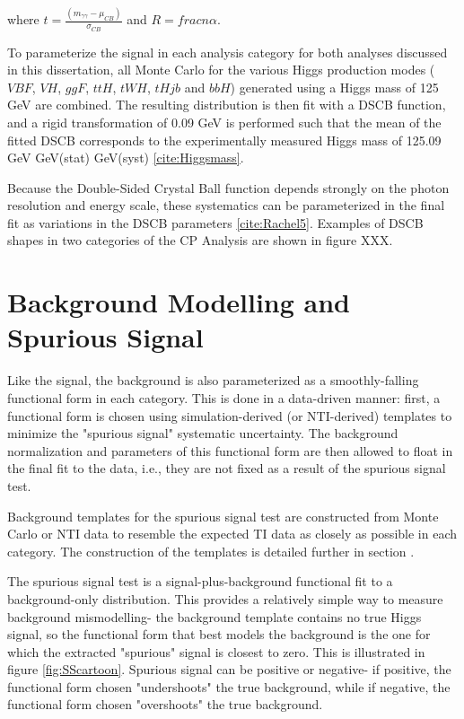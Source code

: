 where $t = \frac{(m_{\gamma \gamma} - \mu_{CB})}{\sigma_{CB}}$ and $R = frac{n}{\alpha}$. 

To parameterize the signal in each analysis category for both analyses discussed in this dissertation, all Monte Carlo for the various Higgs production modes ($VBF$, $VH$, $ggF$, $ttH$, $tWH$, $tHjb$ and $bbH$) generated using a Higgs mass of 125 GeV are combined. The resulting distribution is then fit with a DSCB function, and a rigid transformation of 0.09 GeV is performed such that the mean of the fitted DSCB corresponds to the experimentally measured Higgs mass of 125.09 GeV  GeV(stat)  GeV(syst) \ref{cite:Higgsmass}.

Because the Double-Sided Crystal Ball function depends strongly on the photon resolution and energy scale, these systematics can be parameterized in the final fit as variations in the DSCB parameters \ref{cite:Rachel5}. Examples of DSCB shapes in two categories of the CP Analysis are shown in figure XXX.

\begin{figure}
\end{figure}

\section{Background Modelling and Spurious Signal} \label{sec:background_modelling} 

Like the signal, the background is also parameterized as a smoothly-falling functional form in each category. This is done in a data-driven manner: first, a functional form is chosen using simulation-derived (or NTI-derived) templates to minimize the "spurious signal" systematic uncertainty. The background normalization and parameters of this functional form are then allowed to float in the final fit to the data, i.e., they are not fixed as a result of the spurious signal test. 

Background templates for the spurious signal test are constructed from Monte Carlo or NTI data to resemble the expected TI data as closely as possible in each category. The construction of the templates is detailed further in section \label{sec:bkgtemplates}.

The spurious signal test is a signal-plus-background functional fit to a background-only distribution. This provides a relatively simple way to measure background mismodelling- the background template contains no true Higgs signal, so the functional form that best models the background is the one for which the extracted "spurious" signal is closest to zero. This is illustrated in figure \ref{fig:SScartoon}. Spurious signal can be positive or negative- if positive, the functional form chosen "undershoots" the true background, while if negative, the functional form chosen "overshoots" the true background.

